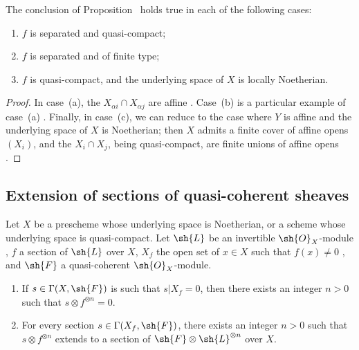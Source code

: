 \begin{corollary}[9.2.2]
\label{I.9.2.2}
The conclusion of Proposition~ holds true in each of the following cases:
\begin{enumerate}
  \item[{\rm(a)}] $f$ is separated and quasi-compact;
  \item[{\rm(b)}] $f$ is separated and of finite type;
  \item[{\rm(c)}] $f$ is quasi-compact, and the underlying space of $X$ is locally Noetherian.
\end{enumerate}
\end{corollary}

\begin{proof}
In case~(a), the $X_{\alpha i}\cap X_{\alpha j}$ are affine .
Case~(b) is a particular example of case~(a) . Finally, in case~(c), we can reduce to the case where $Y$ is affine and the underlying space of $X$ is Noetherian; then $X$ admits a finite cover of affine opens $(X_i)$, and the $X_i\cap X_j$, being quasi-compact, are finite unions of affine opens .
\end{proof}

\subsection{Extension of sections of quasi-coherent sheaves}
\label{subsection:I.9.3}

\begin{theorem}[9.3.1]
\label{I.9.3.1}
Let $X$ be a prescheme whose underlying space is Noetherian, or a scheme whose underlying
space is quasi-compact. Let $\sh{L}$ be an invertible $\sh{O}_X$-module , $f$ a
section of $\sh{L}$ over $X$, $X_f$ the open set of $x\in X$ such that $f(x)\neq0$
, and $\sh{F}$ a quasi-coherent $\sh{O}_X$-module.
\begin{enumerate}
  \item[{\rm(i)}] If $s\in\Gamma(X,\sh{F})$ is such that $s|X_f=0$, then there exists an integer $n>0$ such that $s\otimes f^{\otimes n}=0$.
  \item[{\rm(ii)}] For every section $s\in\Gamma(X_f,\sh{F})$, there exists an integer $n>0$ such that $s\otimes f^{\otimes n}$ extends to a section of $\sh{F}\otimes\sh{L}^{\otimes n}$ over $X$.
\end{enumerate}
\end{theorem}

